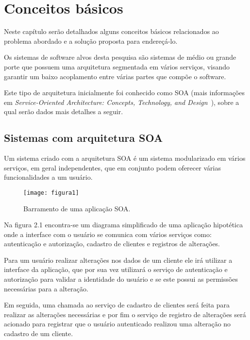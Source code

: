 
\chapter{Conceitos básicos}
\label{cap:conceitos-basicos}

Neste capítulo serão detalhados alguns conceitos básicos relacionados ao problema
abordado e a solução proposta para endereçá-lo.

Os sistemas de software alvos desta pesquisa são sistemas de médio ou grande porte
que possuem uma arquitetura segmentada em vários serviços, visando garantir um
baixo acoplamento entre várias partes que compõe o software.

Este tipo de arquitetura inicialmente foi conhecido como SOA (mais informações em 
\emph{Service-Oriented Architecture: Concepts, Technology, and Design}~\citep{erl}),
sobre a qual serão dados mais detalhes a seguir.

\section{Sistemas com arquitetura SOA}
\label{sec:sistemas-com-arquitetura-soa}

Um sistema criado com a arquitetura SOA é um sistema modularizado em vários
serviços, em geral independentes, que em conjunto podem oferecer várias
funcionalidades a um usuário.

\begin{figure}
  \centering
  \texttt{[image: figura1]}
  \caption{Barramento de uma aplicação SOA.\label{fig:barramento-de-uma-aplicacao-soa}}
\end{figure}

Na figura 2.1 encontra-se um diagrama simplificado de uma aplicação hipotética onde
a interface com o usuário se comunica com vários serviços como: autenticação e
autorização, cadastro de clientes e registros de alterações.

Para um usuário realizar alterações nos dados de um cliente ele irá utilizar a
interface da aplicação, que por sua vez utilizará o serviço de autenticação e
autorização para validar a identidade do usuário e se este possui as permissões
necessárias para a alteração.

Em seguida, uma chamada ao serviço de cadastro de clientes será feita para realizar
as alterações necessárias e por fim o serviço de registro de alterações será
acionado para registrar que o usuário autenticado realizou uma alteração no
cadastro de um cliente.

